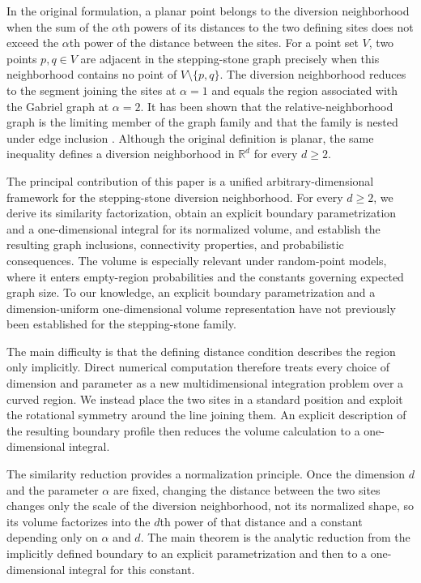 \documentclass[a4paper,fleqn]{cas-dc}
\theoremstyle{definition}
\theoremstyle{remark}
\newcommand{\R}{\mathds{R}}
\newcommand{\0}{\mathbf{0}}
\begin{document}
In the original formulation,
a planar point belongs to the diversion neighborhood
when the sum of the $\alpha$th powers of its distances to the two defining
sites does not exceed the $\alpha$th power of the distance between the
sites. For a point set $V$, two points $p,q\in V$ are adjacent in the
stepping-stone graph precisely when this neighborhood contains no point of
$V\setminus\{p,q\}$.
The diversion neighborhood reduces to the segment
joining the sites at $\alpha=1$ and equals the region associated with the
Gabriel graph at $\alpha=2$.
It has been shown that the relative-neighborhood graph is the limiting
member of the graph family and that the family is nested under edge inclusion
\citep{kannangara2018stepping,kannangara2019stepping}.
Although the original definition is planar, the same inequality defines a
diversion neighborhood
in $\R^d$ for every $d\geq2$.


The principal contribution of this paper is a unified arbitrary-dimensional
framework for the stepping-stone diversion neighborhood. For every
$d\geq2$, we derive its similarity factorization, obtain an explicit boundary
parametrization and a one-dimensional integral for its normalized volume,
and establish the resulting graph inclusions, connectivity properties,
and probabilistic consequences.
The volume is especially relevant under random-point models, where it enters
empty-region probabilities and the constants governing expected graph size.
To our knowledge, an explicit boundary parametrization and a
dimension-uniform one-dimensional volume representation have not previously
been established for the stepping-stone family.


The main difficulty is that the defining distance condition describes the
region only implicitly. Direct numerical computation therefore treats every
choice of dimension and parameter as a new multidimensional integration
problem over a curved region. We instead place the two sites in a standard
position and exploit the rotational symmetry around the line joining them.
An explicit description of the resulting boundary profile then reduces the
volume calculation to a one-dimensional integral.

The similarity reduction provides a normalization principle. Once the
dimension $d$ and the parameter $\alpha$ are fixed, changing the distance
between the two sites changes only the scale of the diversion neighborhood,
not its normalized shape, so its volume factorizes into the $d$th power of
that distance and a constant depending only on $\alpha$ and $d$. The main
theorem is the analytic reduction from the implicitly defined boundary to an
explicit parametrization and then to a one-dimensional integral for this
constant.
\end{document}
